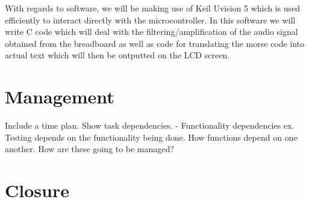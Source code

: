 \documentclass{cce2014-design}
\begin{document}
 With regards to software, we will be making use of Keil Uvision 5 which is used efficiently to interact directly with the 
 microcontroller. In this software we will write C code which will deal with the filtering/amplification of the audio signal obtained
 from the breadboard as well as code for translating the morse code into actual text which will then be outputted on the LCD screen.





\section{Management}
Include a time plan.
Show task dependencies. - Functionality dependencies ex. Testing depends on the functionality being done. How functions depend on one another.
How are these going to be managed?

\section{Closure}



\end{document}
